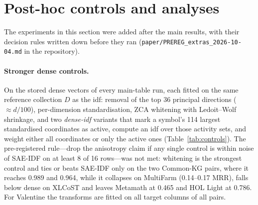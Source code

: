 \documentclass[11pt]{article}
\newcommand{\method}{SAE\mbox{-}IDF\xspace}
\begin{document}
\begin{table}[H]
  \centering\footnotesize
  
  \caption{Margin-based abstention. Cov.@90\%: the fraction of queries that can be answered while top-1 precision stays at or above 90\%.}
  \label{tab:abstention}
\end{table}

\section{Post-hoc controls and analyses}
\label{app:controls}

The experiments in this section were added after the main results, with their decision rules written down before they ran (\texttt{paper/PREREG\_extras\_2026-10-04.md} in the repository).

\paragraph{Stronger dense controls.}
On the stored dense vectors of every main-table run, each fitted on the same reference collection $D$ as the idf: removal of the top 36 principal directions ($\approx d/100$), per-dimension standardisation, ZCA whitening with Ledoit--Wolf shrinkage, and two \emph{dense-idf} variants that mark a symbol's 114 largest standardised coordinates as active, compute an idf over those activity sets, and weight either all coordinates or only the active ones (Table~\ref{tab:controls}).
The pre-registered rule---drop the anisotropy claim if any single control is within noise of \method on at least 8 of 16 rows---was not met: whitening is the strongest control and ties or beats \method only on the two Common-KG pairs, where it reaches 0.989 and 0.964, while it collapses on MultiFarm (0.14--0.17 MRR), falls below dense on XLCoST and leaves Metamath at 0.465 and HOL Light at 0.786.
For Valentine the transforms are fitted on all target columns of all pairs.

\begin{table}[H]
  \centering\scriptsize
  \setlength{\tabcolsep}{4pt}
  
  \caption{Stronger dense controls (MRR unless stated). Bold: best per row. Whitening recovers the knowledge-graph rows and nothing else; no control comes within 0.1 MRR of \method on Metamath or HOL Light.}
  \label{tab:controls}
\end{table}
\end{document}
